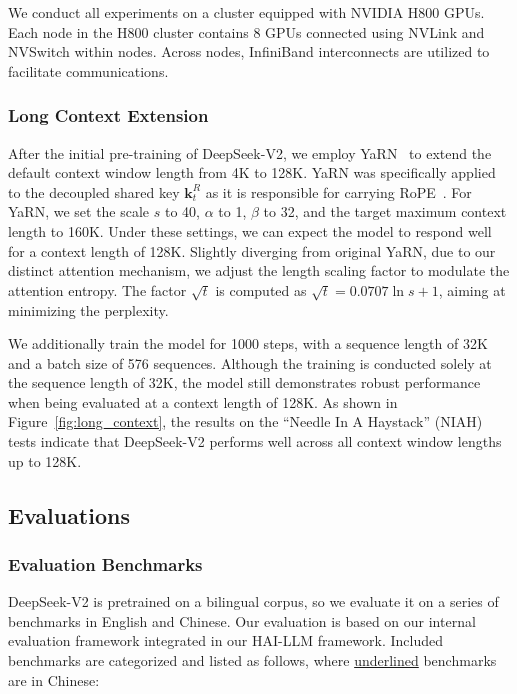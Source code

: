 We conduct all experiments on a cluster equipped with NVIDIA H800 GPUs. Each node in the H800 cluster contains 8 GPUs connected using NVLink and NVSwitch within nodes. Across nodes, InfiniBand interconnects are utilized to facilitate communications. 

\subsubsection{Long Context Extension}

After the initial pre-training of DeepSeek-V2, we employ YaRN~\citep{peng2023yarn} to extend the default context window length from 4K to 128K. YaRN was specifically applied to the decoupled shared key $\mathbf{k}^R_t$ as it is responsible for carrying RoPE~\citep{su2024roformer}. For YaRN, we set the scale $s$ to 40, $\alpha$ to 1, $\beta$ to 32, and the target maximum context length to 160K. Under these settings, we can expect the model to respond well for a context length of 128K. Slightly diverging from original YaRN, due to our distinct attention mechanism, we adjust the length scaling factor to modulate the attention entropy. The factor $\sqrt{t}$ is computed as $\sqrt{t} = 0.0707 \ln{s} + 1$, aiming at minimizing the perplexity.

We additionally train the model for 1000 steps, with a sequence length of 32K and a batch size of 576 sequences. Although the training is conducted solely at the sequence length of 32K, the model still demonstrates robust performance when being evaluated at a context length of 128K. As shown in Figure~\ref{fig:long_context}, the results on the ``Needle In A Haystack'' (NIAH) tests indicate that DeepSeek-V2 performs well across all context window lengths up to 128K.

\subsection{Evaluations}

\subsubsection{Evaluation Benchmarks}

DeepSeek-V2 is pretrained on a bilingual corpus, so we evaluate it on a series of benchmarks in English and Chinese. Our evaluation is based on our internal evaluation framework integrated in our HAI-LLM framework. Included benchmarks are categorized and listed as follows, where \underline{underlined} benchmarks are in Chinese:

